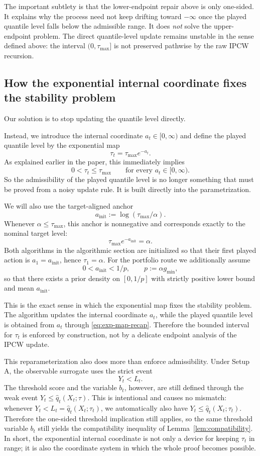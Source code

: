 \documentclass[11pt]{article}
\newcommand{\1}{\mathbf{1}}
\begin{document}
The important subtlety is that the lower-endpoint repair above is only one-sided. It explains why the process need not keep drifting toward $-\infty$ once the played quantile level falls below the admissible range. It does \emph{not} solve the upper-endpoint problem. The direct quantile-level update remains unstable in the sense defined above: the interval $(0,\tau_{\max}]$ is not preserved pathwise by the raw IPCW recursion.

\subsection{How the exponential internal coordinate fixes the stability problem}

Our solution is to stop updating the quantile level directly.

Instead, we introduce the internal coordinate $a_t\in[0,\infty)$ and define the played quantile level by the exponential map
\begin{equation}
\label{eq:exp-map-recap}
\tau_t=\tau_{\max}e^{-a_t}.
\end{equation}
As explained earlier in the paper, this immediately implies
\[
0<\tau_t\le \tau_{\max}
\qquad\text{for every }a_t\in[0,\infty).
\]
So the admissibility of the played quantile level is no longer something that must be proved from a noisy update rule. It is built directly into the parametrization.

We will also use the target-aligned anchor
\[
a_{\mathrm{init}}:=\log(\tau_{\max}/\alpha).
\]
Whenever \(\alpha\le \tau_{\max}\), this anchor is nonnegative and corresponds exactly to the nominal target level:
\[
\tau_{\max}e^{-a_{\mathrm{init}}}=\alpha.
\]
Both algorithms in the algorithmic section are initialized so that their first played action is \(a_1=a_{\mathrm{init}}\), hence \(\tau_1=\alpha\). For the portfolio route we additionally assume
\[
0<a_{\mathrm{init}}<1/p,
\qquad p:=\alpha g_{\min},
\]
so that there exists a prior density on \([0,1/p]\) with strictly positive lower bound and mean \(a_{\mathrm{init}}\).

This is the exact sense in which the exponential map fixes the stability problem. The algorithm updates the internal coordinate $a_t$, while the played quantile level is obtained from $a_t$ through \eqref{eq:exp-map-recap}. Therefore the bounded interval for $\tau_t$ is enforced by construction, not by a delicate endpoint analysis of the IPCW update.

This reparameterization also does more than enforce admissibility. Under Setup A, the observable surrogate uses the strict event
\[
Y_t< L_t.
\]
The threshold score and the variable $b_t$, however, are still defined through the weak event $Y_t\le \hat q_t(X_t;\tau)$. This is intentional and causes no mismatch: whenever $Y_t< L_t=\hat q_t(X_t;\tau_t)$, we automatically also have $Y_t\le \hat q_t(X_t;\tau_t)$. Therefore the one-sided threshold implication still applies, so the same threshold variable $b_t$ still yields the compatibility inequality of Lemma~\ref{lem:compatibility}. In short, the exponential internal coordinate is not only a device for keeping $\tau_t$ in range; it is also the coordinate system in which the whole proof becomes possible.
\end{document}
